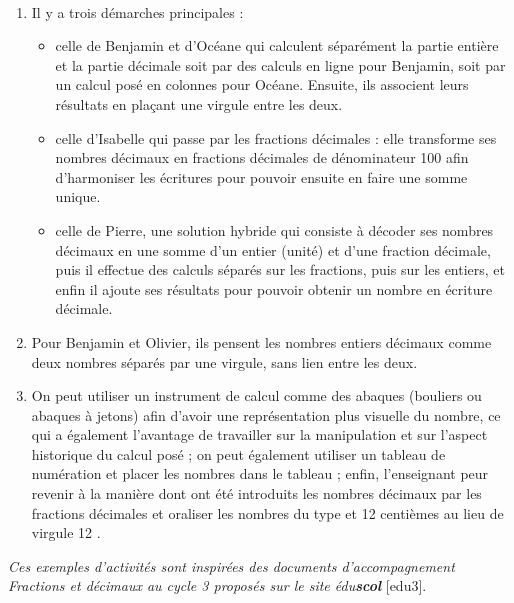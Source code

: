 \begin{corrige}
\ \\ [-5mm]
\begin{enumerate}
   \item Il y a trois démarches principales :
   \begin{itemize}
      \item celle de Benjamin et d'Océane qui calculent séparément la partie entière et la partie décimale soit par des calculs en ligne pour Benjamin, soit par un calcul posé en colonnes pour Océane. Ensuite, ils associent leurs résultats en plaçant une virgule entre les deux.
      \item celle d'Isabelle qui passe par les fractions décimales : elle transforme ses nombres décimaux en fractions décimales de dénominateur 100 afin d'harmoniser les écritures pour pouvoir ensuite en faire une somme unique.
      \item celle de Pierre, une solution hybride qui consiste à décoder ses nombres décimaux en une somme d'un entier (unité) et d'une fraction décimale, puis il effectue des calculs séparés sur les fractions, puis sur les entiers, et enfin il ajoute ses résultats pour pouvoir obtenir un nombre en écriture décimale.
   \end{itemize}
   \item Pour Benjamin et Olivier, ils pensent les nombres entiers décimaux comme deux nombres séparés par une virgule, sans lien entre les deux.
   \item On peut utiliser un instrument de calcul comme des abaques (bouliers ou abaques à jetons) afin d'avoir une représentation plus visuelle du nombre, ce qui a également l'avantage de travailler sur la manipulation et sur l'aspect historique du calcul posé ; on peut également utiliser un tableau de numération et placer les nombres dans le tableau ; enfin, l'enseignant peur revenir à la manière dont ont été introduits les nombres décimaux par les fractions décimales et oraliser les nombres du type  et 12 centièmes \fg{} au lieu de  virgule 12 \fg{}.
\end{enumerate}
\end{corrige}


\Recreation

\setcounter{exercice}{0}

{\it Ces exemples d'activités sont inspirées des documents d'accompagnement \og Fractions et décimaux au cycle 3 \fg{} proposés sur le site édu{\bf scol}} [edu3]. \\


